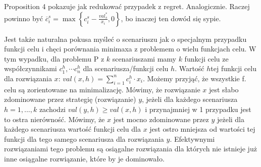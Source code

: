 Proposition 4 pokazuje jak redukować przypadek z regret. Analogicznie. Raczej powinno być $\overline{c}_{i}^{s}= \max \left\{ c_{i}^{s} - \frac{val^{\ast}_{s}}{x_{i}}, 0 \right\}$, bo inaczej ten dowód się sypie.

Jest także naturalna pokusa myśleć o scenariuszu jak o specjalnym przypadku funkcji celu i chęci porównania minimaxa z problemem o wielu funkcjach celu. W tym wypadku, dla problemu P z $k$ scenariuszami mamy $k$ funkcji celu ze współczynnikami $c_{1}^{h}, \cdots c_{n}^{h}$ dla scenariusza/funkcji celu $h$. Wartość $h$tej funkcji celu dla rozwiązania $x$: $val \left( x, h \right) = \sum_{i=1}^{n} c_{i}^{h} \cdot x_{i}$. Możemy przyjąć, że wszystkie f. celu są zorientowane na minimalizację. Mówimy, że rozwiązanie $x$ jest słabo zdominowane przez strategię (rozwiązanie) $y$, jeżeli dla każdego scenariusza $h = 1, ..., k$ zachodzi $val \left( y, h \right) \geqslant val \left( x, h \right)$ i przynajmniej w 1 przypadku jest to ostra nierówność. Mówimy, że $x$ jest mocno zdominowane przez $y$ jeżeli dla każdego scenariusza wartość funkcji celu dla $x$ jest ostro mniejsza od wartości tej funkcji dla tego samego scenariusza dla rozwiązania $y$. Efektywnymi rozwiązaniami tego problemu są osiągalne rozwiązania dla których nie istnieje już inne osiągalne rozwiązanie, które by je dominowało. 


